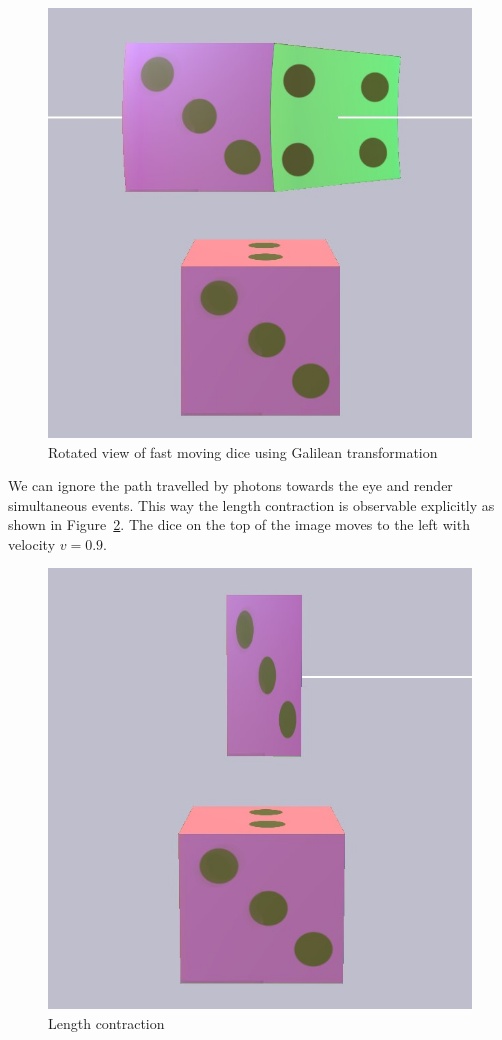 \documentclass{egpubl}
\begin{document}
\begin{figure}[htb]
\center
\includegraphics[width=0.8\linewidth]{figures/rotatingDiceGalilean.jpg}
\caption{Rotated view of fast moving dice using Galilean transformation}
\label{fig:RotatingDice_Galilean}
\end{figure}

We can ignore the path travelled by photons towards the eye and render simultaneous events. This way the length contraction is observable explicitly as shown in Figure~\ref{fig:lengthContraction}. The dice on the top of the image moves to the left with velocity $v=0.9$.
\begin{figure}[htb]
\center
\includegraphics[width=0.8\linewidth]{figures/length_contraction.jpg}
\caption{Length contraction}
\label{fig:lengthContraction}
\end{figure}
\end{document}
